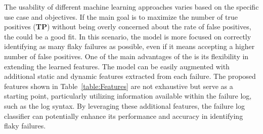 The usability of different machine learning approaches varies based on the specific use case and objectives. If the main goal is to maximize the number of true positives (\textbf{TP}) without being overly concerned about the rate of false positives, the \classifier could be a good fit. In this scenario, the model is more focused on correctly identifying as many flaky failures as possible, even if it means accepting a higher number of false positives.
One of the main advantages of the \classifier is its flexibility in extending the learned features. The model can be easily augmented with additional static and dynamic features extracted from each failure. The proposed features shown in Table~\ref{table:Features} are not exhaustive but serve as a starting point, particularly utilizing information available within the failure log, such as the log syntax.
By leveraging these additional features, the failure log classifier can potentially enhance its performance and accuracy in identifying flaky failures.








